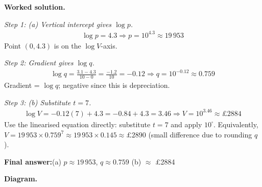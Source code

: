 \documentclass[11pt]{article}
\begin{document}
\textbf{Worked solution.}

\textit{Step 1: (a) Vertical intercept gives \( \log p \).}
\[\begin{gathered}
\log p = 4.3 \Rightarrow p = 10^{4.3} \approx 19\,953
\end{gathered}\]
Point \( (0, 4.3) \) is on the \( \log V \)-axis.

\textit{Step 2: Gradient gives \( \log q \).}
\[\begin{gathered}
\log q = \frac{3.1 - 4.3}{10 - 0} = \frac{-1.2}{10} = -0.12 \Rightarrow q = 10^{-0.12} \approx 0.759
\end{gathered}\]
Gradient = \( \log q \); negative since this is depreciation.

\textit{Step 3: (b) Substitute \( t = 7 \).}
\[\begin{gathered}
\log V = -0.12(7) + 4.3 = -0.84 + 4.3 = 3.46 \Rightarrow V = 10^{3.46} \approx \pounds 2884
\end{gathered}\]
Use the linearised equation directly: substitute \( t = 7 \) and apply \( 10^{\square} \). Equivalently, \( V = 19\,953 \times 0.759^{7} \approx 19\,953 \times 0.145 \approx \pounds 2890 \) (small difference due to rounding \( q \)).

\begin{answerbox}
\textbf{Final answer:}\quad (a) \(\displaystyle  p \approx 19\,953 \), \(\displaystyle  q \approx 0.759 \) \quad  (b) $\approx$ \pounds 2884
\end{answerbox}
\textbf{Diagram.}
\end{document}
